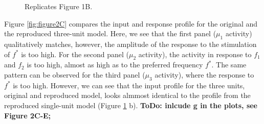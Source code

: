 \begin{figure}
 \caption{Replicates Figure 1B.}
 \label{fig:figure1B}
\end{figure}

Figure \ref{fig:figure2C} compares the input and response profile for the original and the reproduced three-unit model. 
Here, we see that the first panel ($\mu_1$ activity) qualitatively matches, however, the amplitude of the response to the stimulation of $f^*$ is too high.
For the second panel ($\mu_2$ activity), the activity in response to $f_1$ and $f_2$ is too high, almost as high as to the preferred frequency $f^*$.
The same pattern can be observed for the third panel ($\mu_3$ activity), where the response to $f^*$ is too high.
However, we can see that the input profile for the three units, original and reproduced model, looks almmost identical to the 
profile from the reproduced single-unit model (Figure \ref{fig:figure1B} b). \textbf{ToDo: inlcude g in the plots, see Figure 2C-E;}

